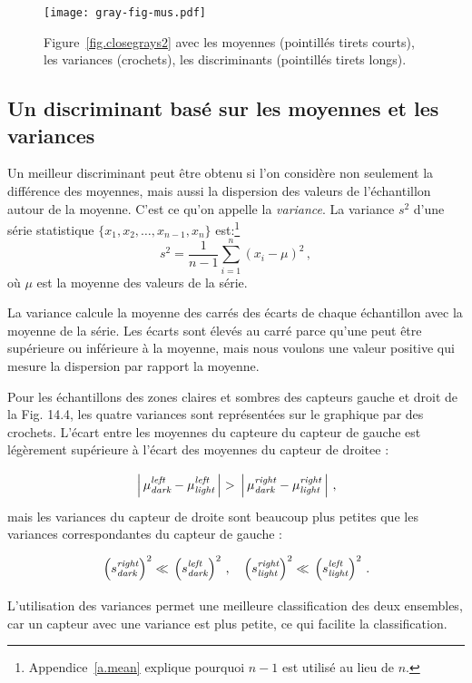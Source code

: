 \begin{figure}
\begin{center}
\texttt{[image: gray-fig-mus.pdf]}
\end{center}
\caption{Figure~\ref{fig.closegrays2} avec les moyennes (pointillés tirets courts), les variances (crochets), les discriminants (pointillés tirets longs).}\label{fig.closegraysmus}
\end{figure}

\subsection{Un discriminant basé sur les moyennes et les variances}

Un meilleur discriminant peut être obtenu si l'on considère non seulement la différence des moyennes, mais aussi la dispersion des valeurs de l'échantillon autour de la moyenne. C'est ce qu'on appelle la \emph{variance}. La variance $s^2$ d'une série statistique $\{x_1,x_2,\ldots,x_{n-1},x_n\}$ est:\footnote{Appendice~\ref{a.mean} explique pourquoi $n-1$ est utilisé au lieu de $n$.}
\[
s^2 = \frac{1}{n-1} \sum_{i=1}^n (x_i-\mu)^2\,,
\]
où $\mu$ est la moyenne des valeurs de la série.

La variance calcule la moyenne des carrés des écarts de chaque échantillon avec la moyenne de la série. Les écarts sont élevés au carré parce qu’une  peut être supérieure ou inférieure à la moyenne, mais nous voulons une valeur positive qui mesure la dispersion par rapport la moyenne.

Pour les échantillons des zones claires et sombres des capteurs gauche et droit de la Fig. 14.4, les quatre variances sont représentées sur le graphique par des crochets. L’écart entre les moyennes du capteure du capteur de gauche est légèrement supérieure à l’écart des moyennes du capteur de droitee :
\[
\rule[-2ex]{0pt}{6ex}\left|\,\mu_{\sub{dark}}^{\sub{left}}-\mu_{\sub{light}}^{\sub{left}}\,\right| > \rule[-2ex]{0pt}{6ex}\left|\,\mu_{\sub{dark}}^{\sub{right}}-\mu_{\sub{light}}^{\sub{right}}\,\right|\,,
\]
mais les variances du capteur de droite sont beaucoup plus petites que les variances correspondantes du capteur de gauche :
\[
\rule[-2ex]{0pt}{6ex}\left(s_{\sub{dark}}^{\sub{right}}\right)^2
\ll
\rule[-3ex]{0pt}{6ex}\left(s_{\sub{dark}}^{\sub{left}}\right)^2\,,\;\;\;
\rule[-2ex]{0pt}{6ex}\left(s_{\sub{light}}^{\sub{right}}\right)^2
\ll
\rule[-3ex]{0pt}{6ex}\left(s_{\sub{light}}^{\sub{left}}\right)^2\,.
\]
L'utilisation des variances permet une meilleure classification des deux ensembles, car un capteur avec une variance est plus petite, ce qui facilite la classification.

